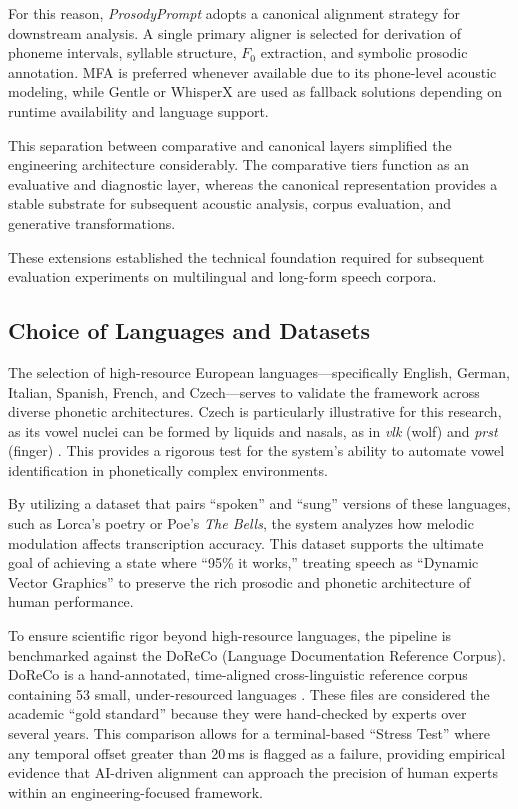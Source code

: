 For this reason, \textit{ProsodyPrompt} adopts a canonical alignment strategy for downstream analysis. A single primary aligner is selected for derivation of phoneme intervals, syllable structure, \(F_0\) extraction, and symbolic prosodic annotation. MFA is preferred whenever available due to its phone-level acoustic modeling, while Gentle or WhisperX are used as fallback solutions depending on runtime availability and language support.

This separation between comparative and canonical layers simplified the engineering architecture considerably. The comparative tiers function as an evaluative and diagnostic layer, whereas the canonical representation provides a stable substrate for subsequent acoustic analysis, corpus evaluation, and generative transformations.

These extensions established the technical foundation required for subsequent evaluation experiments on multilingual and long-form speech corpora.

\subsection{Choice of Languages and Datasets}

The selection of high-resource European languages---specifically English, German, Italian, Spanish, French, and Czech---serves to validate the framework across diverse phonetic architectures. Czech is particularly illustrative for this research, as its vowel nuclei can be formed by liquids and nasals, as in \textit{vlk} (wolf) and \textit{prst} (finger) \cite{paschen2020doreco}. This provides a rigorous test for the system’s ability to automate vowel identification in phonetically complex environments.

By utilizing a dataset that pairs ``spoken'' and ``sung'' versions of these languages, such as Lorca’s poetry or Poe’s \textit{The Bells}, the system analyzes how melodic modulation affects transcription accuracy. This dataset supports the ultimate goal of achieving a state where ``95\% it works,'' treating speech as ``Dynamic Vector Graphics'' to preserve the rich prosodic and phonetic architecture of human performance.

To ensure scientific rigor beyond high-resource languages, the pipeline is benchmarked against the DoReCo (Language Documentation Reference Corpus). DoReCo is a hand-annotated, time-aligned cross-linguistic reference corpus containing 53 small, under-resourced languages \cite{paschen2020doreco}. These files are considered the academic ``gold standard'' because they were hand-checked by experts over several years. This comparison allows for a terminal-based ``Stress Test'' where any temporal offset greater than 20\,ms is flagged as a failure, providing empirical evidence that AI-driven alignment can approach the precision of human experts within an engineering-focused framework.

